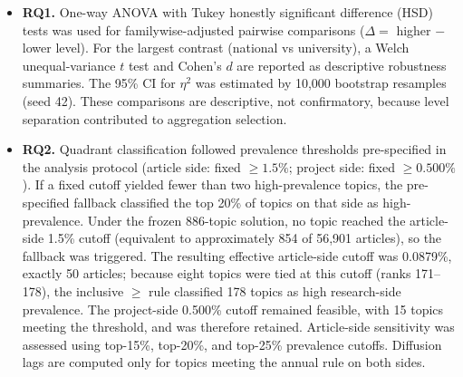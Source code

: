 \documentclass[11pt]{article}
\begin{document}
\begin{itemize}
\item \textbf{RQ1.} One-way ANOVA with Tukey honestly significant difference (HSD) tests was used for familywise-adjusted pairwise comparisons ($\Delta=$ higher $-$ lower level). For the largest contrast (national vs university), a Welch unequal-variance $t$ test and Cohen's $d$ are reported as descriptive robustness summaries. The 95\% CI for $\eta^2$ was estimated by 10,000 bootstrap resamples (seed 42). These comparisons are descriptive, not confirmatory, because level separation contributed to aggregation selection.

\item \textbf{RQ2.} Quadrant classification followed prevalence thresholds pre-specified in the analysis protocol (article side: fixed $\ge1.5\%$; project side: fixed $\ge0.500\%$). If a fixed cutoff yielded fewer than two high-prevalence topics, the pre-specified fallback classified the top 20\% of topics on that side as high-prevalence. Under the frozen 886-topic solution, no topic reached the article-side 1.5\% cutoff (equivalent to approximately 854 of 56,901 articles), so the fallback was triggered. The resulting effective article-side cutoff was 0.0879\%, exactly 50 articles; because eight topics were tied at this cutoff (ranks 171--178), the inclusive $\ge$ rule classified 178 topics as high research-side prevalence. The project-side 0.500\% cutoff remained feasible, with 15 topics meeting the threshold, and was therefore retained. Article-side sensitivity was assessed using top-15\%, top-20\%, and top-25\% prevalence cutoffs. Diffusion lags are computed only for topics meeting the annual rule on both sides.


\end{itemize}
\end{document}
